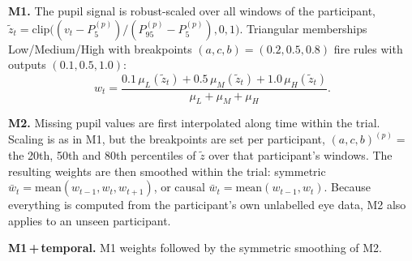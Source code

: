 \documentclass[10pt,a4paper]{article}
\begin{document}
\textbf{M1.} The pupil signal is robust-scaled over all windows of the participant, $\tilde z_t=\mathrm{clip}\big((v_t-P_5^{(p)})/(P_{95}^{(p)}-P_5^{(p)}),0,1\big)$. Triangular memberships Low/Medium/High with breakpoints $(a,c,b)=(0.2,0.5,0.8)$ fire rules with outputs $(0.1,0.5,1.0)$:
\[ w_t=\frac{0.1\,\mu_L(\tilde z_t)+0.5\,\mu_M(\tilde z_t)+1.0\,\mu_H(\tilde z_t)}{\mu_L+\mu_M+\mu_H}. \]

\textbf{M2.} Missing pupil values are first interpolated along time within the trial. Scaling is as in M1, but the breakpoints are set per participant, $(a,c,b)^{(p)}=$ the 20th, 50th and 80th percentiles of $\tilde z$ over that participant's windows. The resulting weights are then smoothed within the trial: symmetric $\bar w_t=\mathrm{mean}(w_{t-1},w_t,w_{t+1})$, or causal $\bar w_t=\mathrm{mean}(w_{t-1},w_t)$. Because everything is computed from the participant's own unlabelled eye data, M2 also applies to an unseen participant.

\textbf{M1\,+\,temporal.} M1 weights followed by the symmetric smoothing of M2.
\end{document}
